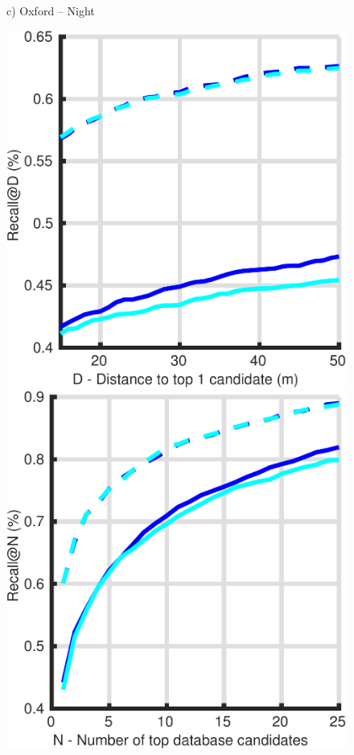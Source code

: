 \begin{figure}
\begin{minipage}{0.27\linewidth}
		c) Oxford -- Night
	\end{minipage}

	\vspace{5pt}	
	
	\begin{minipage}{0.27\linewidth}
		\center \scriptsize
		\includegraphics[width=\linewidth]{plot/night_ft/Results_cmu_lt/distance}	
		
		\includegraphics[width=\linewidth]{plot/night_ft/Results_cmu_lt/recall}
		

\end{minipage}
\end{figure}
